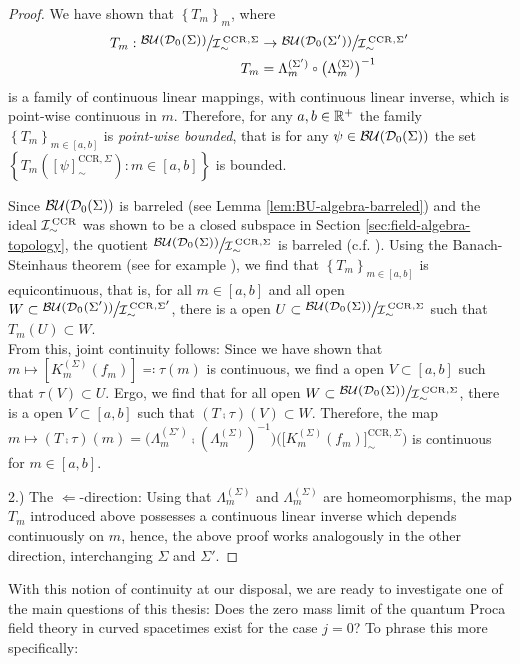 \begin{proof}
We have shown that $\left\{T_{m} \right\}_{m}$, where
\begin{align}
T_{m} : {\Quotientscale{\BU(\Dzs)}{\ICCRS}} & \to {\Quotientscale{\BU(\Dzsp)}{\ICCRSP}}\\
T_{m} &=  \Lambda^{(\Sigma')}_{m} \comp \big( \Lambda^{(\Sigma)}_{m} \big)^{-1} \notag
\end{align}
 is a family of continuous linear mappings, with continuous linear inverse, which is point-wise continuous in $m$.
 Therefore, for any $a,b \in \mathbb{R}^+$ the family $\left\{T_{m} \right\}_{m \in [a,b]}$ is \emph{point-wise bounded}, that is for any $\psi \in \mathcal{BU}(\mathcal{D}_{0}(\Sigma))$ the set $\left\{ T_m([\psi]_\sim^{\text{CCR},\Sigma}) : m \in [a,b] \right\}$ is bounded.\par
Since $\mathcal{BU}(\mathcal{D}_{0}(\Sigma))$ is barreled (see Lemma \ref{lem:BU-algebra-barreled}) and the ideal ${\mathcal{I}}_{\sim}^\text{\,CCR}$ was shown to be a closed subspace in Section \ref{sec:field-algebra-topology}, the quotient ${\Quotientscale{\BU(\Dzs)}{\ICCRS}}$ is barreled (c.f. \cite[Proposition 33.1]{treves}). Using the Banach-Steinhaus theorem (see for example \cite[Theorem 33.1]{treves}), we find that $\left\{T_{m} \right\}_{m \in [a,b]}$ is equicontinuous, that is, for all $m \in [a,b]$ and all open $W \subset {\Quotientscale{\BU(\Dzsp)}{\ICCRSP}}$, there is a open $U \subset {\Quotientscale{\BU(\Dzs)}{\ICCRS}}$ such that $T_m (U) \subset W$.\\ From this, joint continuity follows:
Since we have shown that $m \mapsto \left[ K_m^{(\Sigma)} (f_m)\right] \eqqcolon \tau(m)$ is continuous, we find a open $V \subset [a,b]$ such that $\tau (V) \subset U$. Ergo, we find that for all open $W \subset {\Quotientscale{\BU(\Dzs)}{\ICCRS}}$, there is a open $V \subset [a,b]$ such that $(T \comp \tau)(V) \subset W$. Therefore, the map $m \mapsto (T \comp \tau)(m) = \Big( \Lambda^{(\Sigma')}_m \comp \left( \Lambda^{(\Sigma)}_m \right)^{-1} \Big) \Big(  \big[ K_m^{(\Sigma)}  (f_m)\big]_\sim^{\text{CCR}, \Sigma}\Big)$ is continuous for $m \in [a,b]$. \par
2.) The $\Leftarrow$-direction: Using that $\Lambda^{(\Sigma)}_m$ and $\Lambda^{(\Sigma)}_m$ are homeomorphisms, the map $T_m$ introduced above possesses a continuous linear inverse which depends continuously on $m$, hence, the above proof works analogously in the other direction, interchanging $\Sigma$ and $\Sigma'$.
\end{proof}
%
%
%
%
%
With this notion of continuity at our disposal, we are ready to investigate one of the main questions of this thesis: Does the zero mass limit of the quantum Proca field theory in curved spacetimes exist for the case $j=0$? To phrase this more specifically:
